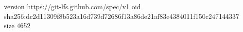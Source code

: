 version https://git-lfs.github.com/spec/v1
oid sha256:dc2d11309f8b523a16d739d72686f13a86de21af83e4384011f150c247144337
size 4652

